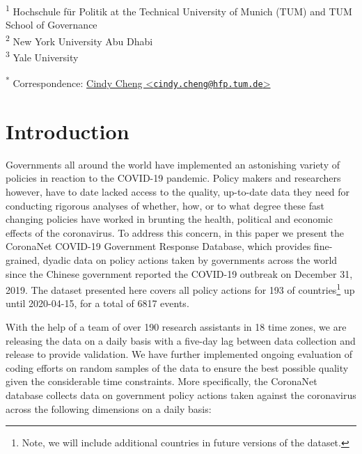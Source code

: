 \documentclass[]{article}
\let\rmarkdownfootnote\footnote%
\def\footnote{\protect\rmarkdownfootnote}
\begin{document}
\textsuperscript{1} Hochschule für Politik at the Technical University of Munich (TUM) and TUM School of Governance\\
\textsuperscript{2} New York University Abu Dhabi\\
\textsuperscript{3} Yale University

\textsuperscript{*} Correspondence: \href{mailto:cindy.cheng@hfp.tum.de}{Cindy Cheng \textless{}\href{mailto:cindy.cheng@hfp.tum.de}{\nolinkurl{cindy.cheng@hfp.tum.de}}\textgreater{}}

\hypertarget{introduction}{%
\section{Introduction}\label{introduction}}

Governments all around the world have implemented an astonishing variety of policies in reaction to the COVID-19 pandemic. Policy makers and researchers however, have to date lacked access to the quality, up-to-date data they need for conducting rigorous analyses of whether, how, or to what degree these fast changing policies have worked in brunting the health, political and economic effects of the coronavirus. To address this concern, in this paper we present the CoronaNet COVID-19 Government Response Database, which provides fine-grained, dyadic data on policy actions taken by governments across the world since the Chinese government reported the COVID-19 outbreak on December 31, 2019. The dataset presented here covers all policy actions for 193 of countries\footnote{Note, we will include additional countries in future versions of the dataset.} up until 2020-04-15, for a total of 6817 events.

With the help of a team of over 190 research assistants in 18 time zones, we are releasing the data on a daily basis with a five-day lag between data collection and release to provide validation. We have further implemented ongoing evaluation of coding efforts on random samples of the data to ensure the best possible quality given the considerable time constraints. More specifically, the CoronaNet database collects data on government policy actions taken against the coronavirus across the following dimensions on a daily basis:
\end{document}

